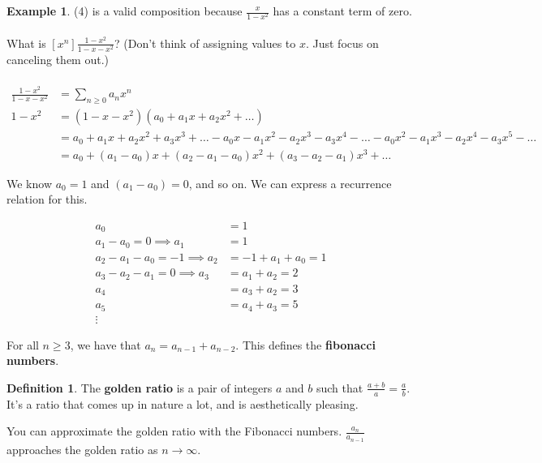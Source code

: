 \documentclass[]{article}
\theoremstyle{definition}
\newtheorem*{defn}{Definition}
\newtheorem{ex}{Example}[section]
\begin{document}
\begin{ex}
					(4) is a valid composition because $\frac{x}{1 - x^2}$ has a constant term of zero.
					\\ \\
					What is $[x^n] \frac{1 - x^2}{1 - x - x^2}$? (Don't think of assigning values to $x$. Just focus on canceling them out.)
					\\ \\
					\begin{align*}
						\frac{1 - x^2}{1 - x - x^2} &= \sum_{n \ge 0} a_n x^n \\
						1 - x^2 &= (1 - x - x^2)(a_0 + a_1x + a_2x^2 + \ldots) \\
						&= a_0 + a_1x + a_2x^2 + a_3x^3 + \ldots - a_0x -a_1x^2 - a_2x^3 - a_3x^4 - \ldots -a_0x^2 - a_1x^3 - a_2x^4 - a_3x^5 - \ldots \\
						&= a_0 + (a_1 - a_0)x + (a_2 - a_1 - a_0)x^2 + (a_3 - a_2 - a_1)x^3 + \ldots
					\end{align*}

					We know $a_0 = 1$ and $(a_1 - a_0) = 0$, and so on. We can express a recurrence relation for this.

					\begin{align*}
						a_0 &= 1 \\
						a_1 - a_0 = 0 \implies a_1 &= 1 \\
						a_2 - a_1 - a_0 = -1 \implies a_2 &= -1 + a_1 + a_0 = 1 \\
						a_3 - a_2 - a_1 = 0 \implies a_3 &= a_1 + a_2 = 2 \\
						a_4 &= a_3 + a_2 = 3 \\
						a_5 &= a_4 + a_3 = 5 \\
						\vdots&
					\end{align*}

					For all $n \ge 3$, we have that $a_n = a_{n - 1} + a_{n - 2}$. This defines the \textbf{fibonacci numbers}.
				\end{ex}

				\begin{defn}
					The \textbf{golden ratio} is a pair of integers $a$ and $b$ such that $\frac{a + b}{a} = \frac{a}{b}$. It's a ratio that comes up in nature a lot, and is aesthetically pleasing.
				\end{defn}

				You can approximate the golden ratio with the Fibonacci numbers. $\frac{a_n}{a_{n - 1}}$ approaches the golden ratio as $n \to \infty$.
\end{document}
